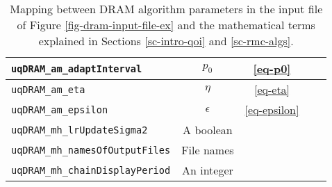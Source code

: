 \begin{sidewaystable}[h]
\begin{center}
\begin{tabular}{|l|c|c|c|c|}
\hline
\verb=uqDRAM_am_adaptInterval=           & $p_0$                               & \eqref{eq-p0}                                & \pageref{eq-p0}                                  &               \\
\hline
\verb=uqDRAM_am_eta=                     & $\eta$                              & \eqref{eq-eta}                               & \pageref{eq-eta}                                 &               \\
\hline
\verb=uqDRAM_am_epsilon=                 & $\epsilon$                          & \eqref{eq-epsilon}                           & \pageref{eq-epsilon}                             &               \\
\hline
\verb=uqDRAM_mh_lrUpdateSigma2=          & A boolean                           &                                              &                                                  &               \\
\hline
\verb=uqDRAM_mh_namesOfOutputFiles=      & File names                          &                                              &                                                  &               \\
\hline
\verb=uqDRAM_mh_chainDisplayPeriod=      & An integer                          &                                              &                                                  &               \\
\hline
\end{tabular}
\caption{Mapping between DRAM algorithm parameters in the input file of Figure \ref{fig-dram-input-file-ex} and the mathematical terms explained in Sections \ref{sc-intro-qoi} and \ref{sc-rmc-algs}.
}
\label{tab-dram-map}
\end{center}
\end{sidewaystable}

